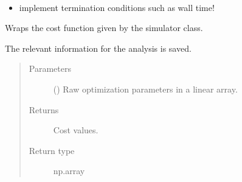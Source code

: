 \documentclass[letterpaper,10pt,english]{sphinxmanual}
\begin{document}
\begin{fulllineitems}
\begin{fulllineitems}
\begin{quote}
\begin{description}
\end{description}\end{quote}

\end{fulllineitems}


\begin{fulllineitems}
\label{\detokenize{qsim:qsim.optimize.Optimizer.TODO}}~\begin{itemize}
\item {} 
implement termination conditions such as wall time!

\end{itemize}

\end{fulllineitems}


\begin{fulllineitems}
\label{\detokenize{qsim:qsim.optimize.Optimizer.cost_fktn_wrapper}}
Wraps the cost function given by the simulator class.

The relevant information for the analysis is saved.
\begin{quote}\begin{description}
\item[{Parameters}] \leavevmode
{} () \textendash{} Raw optimization parameters in a linear array.

\item[{Returns}] \leavevmode
{} \textendash{} Cost values.

\item[{Return type}] \leavevmode
np.array

\end{description}\end{quote}

\end{fulllineitems}



\end{fulllineitems}
\end{document}
